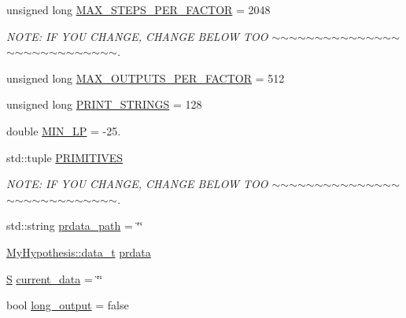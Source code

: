\begin{DoxyCompactItemize}
\item 
unsigned long \hyperlink{_models_2_formal_language_theory-_complex_2main_8cpp_a33cfa353d2570ba1bc9b45b924e890ff}{M\+A\+X\+\_\+\+S\+T\+E\+P\+S\+\_\+\+P\+E\+R\+\_\+\+F\+A\+C\+T\+OR} = 2048
\begin{DoxyCompactList}\small\item\em N\+O\+TE\+: IF Y\+OU C\+H\+A\+N\+GE, C\+H\+A\+N\+GE B\+E\+L\+OW T\+OO $\sim$$\sim$$\sim$$\sim$$\sim$$\sim$$\sim$$\sim$$\sim$$\sim$$\sim$$\sim$$\sim$$\sim$$\sim$$\sim$$\sim$$\sim$$\sim$$\sim$$\sim$$\sim$$\sim$$\sim$$\sim$$\sim$$\sim$$\sim$. \end{DoxyCompactList}\item 
unsigned long \hyperlink{_models_2_formal_language_theory-_complex_2main_8cpp_a78ab994cd90dbad4d470e8b4082ef882}{M\+A\+X\+\_\+\+O\+U\+T\+P\+U\+T\+S\+\_\+\+P\+E\+R\+\_\+\+F\+A\+C\+T\+OR} = 512
\item 
unsigned long \hyperlink{_models_2_formal_language_theory-_complex_2main_8cpp_ad098fee1c76be478fe0683197334c489}{P\+R\+I\+N\+T\+\_\+\+S\+T\+R\+I\+N\+GS} = 128
\item 
double \hyperlink{_models_2_formal_language_theory-_complex_2main_8cpp_aeefd72efb701ee22e6d0c6755d8596b2}{M\+I\+N\+\_\+\+LP} = -\/25.
\item 
std\+::tuple \hyperlink{_models_2_formal_language_theory-_complex_2main_8cpp_a04e6d8e4b74d3f4fc965e5e5449158a3}{P\+R\+I\+M\+I\+T\+I\+V\+ES}
\begin{DoxyCompactList}\small\item\em N\+O\+TE\+: IF Y\+OU C\+H\+A\+N\+GE, C\+H\+A\+N\+GE B\+E\+L\+OW T\+OO $\sim$$\sim$$\sim$$\sim$$\sim$$\sim$$\sim$$\sim$$\sim$$\sim$$\sim$$\sim$$\sim$$\sim$$\sim$$\sim$$\sim$$\sim$$\sim$$\sim$$\sim$$\sim$$\sim$$\sim$$\sim$$\sim$$\sim$$\sim$. \end{DoxyCompactList}\item 
std\+::string \hyperlink{_models_2_formal_language_theory-_complex_2main_8cpp_aad659d32cecc0fd81857e5dbb67e0b1c}{prdata\+\_\+path} = \char`\"{}\char`\"{}
\item 
\hyperlink{class_bayesable_aa2788c4d7718c0a824e1d28c4c98f921}{My\+Hypothesis\+::data\+\_\+t} \hyperlink{_models_2_formal_language_theory-_complex_2main_8cpp_af877d2e50caacf995a851274343f46c5}{prdata}
\item 
\hyperlink{_models_2_formal_language_theory-_complex_2main_8cpp_a51c40915539205f0b5add30b0d68a4cb}{S} \hyperlink{_models_2_formal_language_theory-_complex_2main_8cpp_a7738aad53d0b772202992e9bad69c250}{current\+\_\+data} = \char`\"{}\char`\"{}
\item 
bool \hyperlink{_models_2_formal_language_theory-_complex_2main_8cpp_a41b29b6499f37ab86060debf9c58d19f}{long\+\_\+output} = false
\end{DoxyCompactItemize}


